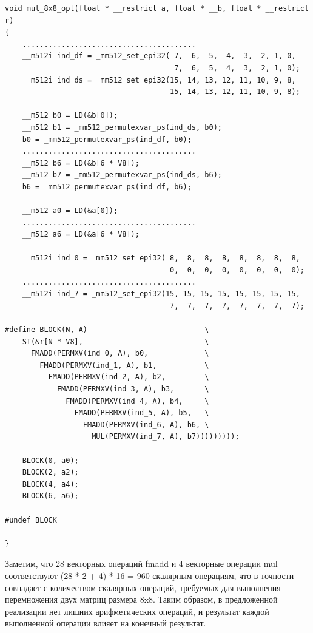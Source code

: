 \begin{lstlisting}[caption={caption},label={label}]
void mul_8x8_opt(float * __restrict a, float * __b, float * __restrict r)
{
    ........................................
    __m512i ind_df = _mm512_set_epi32( 7,  6,  5,  4,  3,  2, 1, 0,
                                       7,  6,  5,  4,  3,  2, 1, 0);
    __m512i ind_ds = _mm512_set_epi32(15, 14, 13, 12, 11, 10, 9, 8,
                                      15, 14, 13, 12, 11, 10, 9, 8);

    __m512 b0 = LD(&b[0]);
    __m512 b1 = _mm512_permutexvar_ps(ind_ds, b0);
    b0 = _mm512_permutexvar_ps(ind_df, b0);
    ........................................
    __m512 b6 = LD(&b[6 * V8]);
    __m512 b7 = _mm512_permutexvar_ps(ind_ds, b6);
    b6 = _mm512_permutexvar_ps(ind_df, b6);

    __m512 a0 = LD(&a[0]);
    ........................................
    __m512 a6 = LD(&a[6 * V8]);

    __m512i ind_0 = _mm512_set_epi32( 8,  8,  8,  8,  8,  8,  8,  8,
                                      0,  0,  0,  0,  0,  0,  0,  0);
    ........................................
    __m512i ind_7 = _mm512_set_epi32(15, 15, 15, 15, 15, 15, 15, 15,
                                      7,  7,  7,  7,  7,  7,  7,  7);

#define BLOCK(N, A)                           \
    ST(&r[N * V8],                            \
      FMADD(PERMXV(ind_0, A), b0,             \
        FMADD(PERMXV(ind_1, A), b1,           \
          FMADD(PERMXV(ind_2, A), b2,         \
            FMADD(PERMXV(ind_3, A), b3,       \
              FMADD(PERMXV(ind_4, A), b4,     \
                FMADD(PERMXV(ind_5, A), b5,   \
                  FMADD(PERMXV(ind_6, A), b6, \
                    MUL(PERMXV(ind_7, A), b7)))))))));

    BLOCK(0, a0);
    BLOCK(2, a2);
    BLOCK(4, a4);
    BLOCK(6, a6);

#undef BLOCK

}
\end{lstlisting}

Заметим, что 28 векторных операций fmadd и 4 векторные операции mul соответствуют (28 * 2 + 4) * 16 = 960 скалярным операциям, что в точности совпадает с количеством скалярных операций, требуемых для выполнения перемножения двух матриц размера 8x8.
Таким образом, в предложенной реализации нет лишних арифметических операций, и результат каждой выполненной операции влияет на конечный результат.

